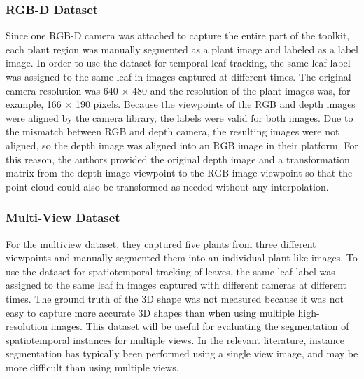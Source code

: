 \subsubsection{RGB-D Dataset}
Since one RGB-D camera was attached to capture the entire part of the toolkit, each plant region was manually segmented as a plant image
and labeled as a label image. In order to use the dataset for temporal leaf tracking, the same leaf label was assigned to the same leaf in
images captured at different times. The original camera resolution was 640 × 480 and the resolution of the plant images was, for example,
166 × 190 pixels. Because the viewpoints of the RGB and depth images were aligned by the camera library, the labels were valid for both images.
Due to the mismatch between RGB and depth camera, the resulting images were not aligned, so the depth image was aligned into an RGB image in their
platform. For this reason, the authors provided the original depth image and a transformation matrix from the depth image viewpoint to the RGB image
viewpoint so that the point cloud could also be transformed as needed without any interpolation.

\subsubsection{Multi-View Dataset}
For the multiview dataset, they captured five plants from three different viewpoints and manually segmented them into an individual plant
like images. To use the dataset for spatiotemporal tracking of leaves, the same leaf label was assigned to the same leaf in images
captured with different cameras at different times. The ground truth of the 3D shape was not measured because it was not easy to
capture more accurate 3D shapes than when using multiple high-resolution images. This dataset will be useful for evaluating the
segmentation of spatiotemporal instances for multiple views. In the relevant literature, instance segmentation has typically been
performed using a single view image, and may be more difficult than using multiple views.

